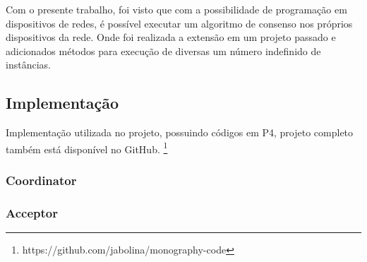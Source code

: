 \documentclass[
    12pt,
    openright, 
    oneside,
    a4paper,
    french,
    english,
    brazil
    ]{facom-ufu-abntex2}
\theoremstyle{definition}
\begin{document}
Com o presente trabalho, foi visto que com a possibilidade de programação em dispositivos de redes, é possível executar um algoritmo
de consenso nos próprios dispositivos da rede. Onde foi realizada a extensão em um projeto passado e adicionados métodos para execução
de diversas um número indefinido de instâncias. 



\begin{anexosenv}
\partanexos
\chapter{Implementação}

Implementação utilizada no projeto, possuindo códigos em P4, projeto completo também está disponível no GitHub.
\footnote{https://github.com/jabolina/monography-code}

\subsection{Coordinator}


\subsection{Acceptor}


\end{anexosenv}
\end{document}
